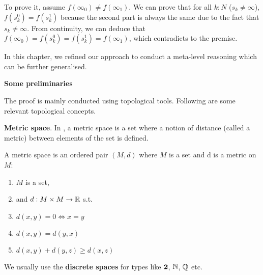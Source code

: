 To prove it, assume $f(\infty_0) \not= f(\infty_1)$.
We can prove that for all $k : N$ ($s_k \not= \infty$), $f(s^0_k) = f(s^1_k)$ because the second part is always the same due to the fact that $s_k \not= \infty$. From continuity, we can deduce that $f(\infty_0) =f(s^0_k) = f(s^1_k) = f(\infty_1)$, which contradicts to the premise.


In this chapter, we refined our approach to conduct a meta-level reasoning which can be further generalised.






\textbf{Some preliminaries}

The proof is mainly conducted using topological tools. Following are some relevant topological concepts.

\begin{definition}
\textbf{Metric space}. In \maths, a metric space is a set where a notion
of distance (called a metric) between elements of the set is defined.

A metric space is an ordered pair $(M , d)$ where $M$ is a set and d is a metric on $M$:
\begin{enumerate}
\item $M$ is a set,
\item and $d : M \times M \rightarrow \mathbb{R}$ s.t.
\item $d (x , y) = 0 \iff x = y$
\item $d(x,y)=d(y,x)$
\item $d(x,y)+d(y,z) \ge d(x,z)$ 
\end{enumerate}
\end{definition}

We usually use the \textbf{discrete spaces} for types like $\mathbf{2}$, $\mathbb{N}$, $\mathbb{Q}$ etc.

